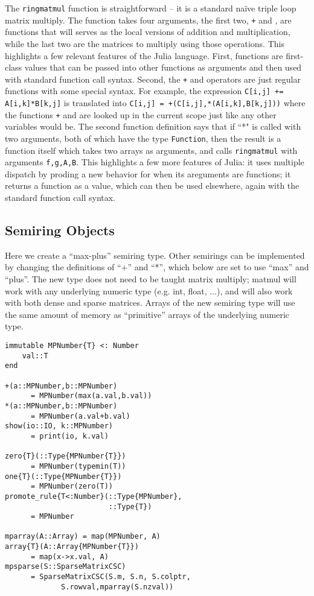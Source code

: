 \documentclass[conference]{IEEEtran}
\begin{document}
The {\tt ringmatmul} function is straightforward -- it is a standard na\"ive triple loop matrix multiply.
The function takes four arguments, the first two, {\tt +} and {\tt *}, are functions that will serves as the local versions of addition and multiplication, while the last two are the matrices to multiply using those operations.
This highlights a few relevant features of the Julia language.
First, functions are first-class values that can be passed into other functions as arguments and then used with standard function call syntax.
Second, the {\tt +} and {\tt *} operators are just regular functions with some special syntax.
For example, the expression {\tt C[i,j] += A[i,k]*B[k,j]} is translated into {\tt C[i,j] = +(C[i,j],*(A[i,k],B[k,j]))} where the functions {\tt +} and {\tt *} are looked up in the current scope just like any other variables would be.
The second function definition says that if ``*"  is called with two arguments, both of which have the type {\tt Function}, then the result is a function itself which takes two arrays as arguments, and calls {\tt ringmatmul} with arguments {\tt f,g,A,B}.
This highlights a few more features of Julia:
it uses multiple dispatch by proding a new behavior for {\tt *} when its areguments are functions;
it returns a function as a value, which can then be used elsewhere, again with the standard function call syntax.

\subsection{Semiring Objects}

Here we create a ``max-plus'' semiring type.  Other semirings can be implemented
by changing the definitions of ``+'' and ``*'', which below are set to use
``max'' and ``plus''.
The new type does not need to be taught matrix multiply; matmul will work with
any underlying numeric type (e.g. int, float, ...), and will also work with
both dense and sparse matrices. Arrays of the new semiring type will use the
same amount of memory as ``primitive'' arrays of the underlying numeric type.


\begin{verbatim}
immutable MPNumber{T} <: Number
    val::T
end

+(a::MPNumber,b::MPNumber)
      = MPNumber(max(a.val,b.val))
*(a::MPNumber,b::MPNumber)
      = MPNumber(a.val+b.val)
show(io::IO, k::MPNumber)
      = print(io, k.val)

zero{T}(::Type{MPNumber{T}})
      = MPNumber(typemin(T))
one{T}(::Type{MPNumber{T}})
      = MPNumber(zero(T))
promote_rule{T<:Number}(::Type{MPNumber},
                        ::Type{T})
      = MPNumber

mparray(A::Array) = map(MPNumber, A)
array{T}(A::Array{MPNumber{T}})
      = map(x->x.val, A)
mpsparse(S::SparseMatrixCSC)
      = SparseMatrixCSC(S.m, S.n, S.colptr,
             S.rowval,mparray(S.nzval))
\end{verbatim}
\end{document}
